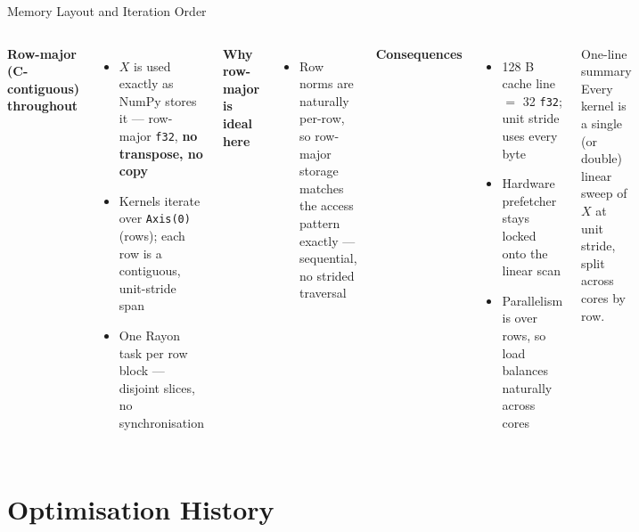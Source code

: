 \documentclass[aspectratio=169]{beamer}
\begin{document}
\begin{frame}{Memory Layout and Iteration Order}
  \begin{columns}[T]
    \textbf{Row-major (C-contiguous) throughout}
    \begin{itemize}
      \item $X$ is used exactly as NumPy stores it --- row-major \texttt{f32},
            \textbf{no transpose, no copy}
      \item Kernels iterate over \texttt{Axis(0)} (rows); each row is a
            contiguous, unit-stride span
      \item One Rayon task per row block --- disjoint slices, no synchronisation
    \end{itemize}
    \textbf{Why row-major is ideal here}
    \begin{itemize}
      \item Row norms are naturally per-row, so row-major storage matches the
            access pattern exactly --- sequential, no strided traversal
    \end{itemize}
    \textbf{Consequences}
    \begin{itemize}
      \item 128 B cache line $=$ 32 \texttt{f32}; unit stride uses every byte
      \item Hardware prefetcher stays locked onto the linear scan
      \item Parallelism is over rows, so load balances naturally across cores
    \end{itemize}
    \vspace{0.4em}
    \begin{block}{One-line summary}
      Every kernel is a single (or double) linear sweep of $X$ at unit stride,
      split across cores by row.
    \end{block}
  \end{columns}
\end{frame}

\section{Optimisation History}
\end{document}
